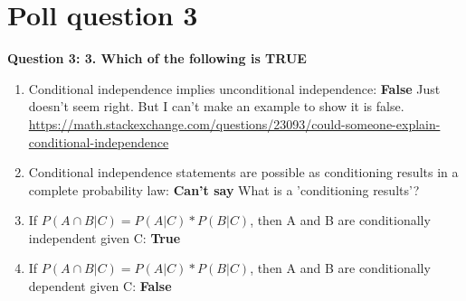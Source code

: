 \documentclass{article}
\begin{document}
\section{Poll question 3}
\textbf{Question 3: 3. Which of the following is TRUE}
\begin{enumerate}
\item{Conditional independence implies unconditional independence: \textbf{False} Just doesn't seem right. But I can't make an example to show it is false. \url{https://math.stackexchange.com/questions/23093/could-someone-explain-conditional-independence}}
\item{Conditional independence statements are possible as conditioning results in a complete probability law: \textbf{Can't say} What is a 'conditioning results'?}
\item{If $P(A\cap{B}|C)=P(A|C)*P(B|C)$, then A and B are conditionally independent given C: \textbf{True}}
\item{If $P(A\cap{B}|C)=P(A|C)*P(B|C)$, then A and B are conditionally dependent given C: \textbf{False}}  
\end{enumerate}
%
%
\end{document}
